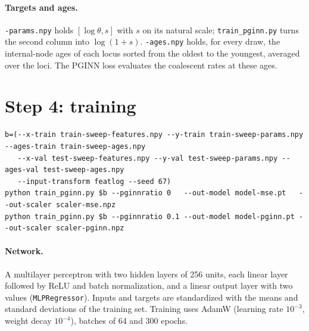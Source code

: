 \documentclass[11pt]{article}
\newcommand{\file}[1]{\texttt{#1}}
\newcommand{\pginn}{PGINN\xspace}
\begin{document}
\paragraph{Targets and ages.}
\file{-params.npy} holds $[\log\theta, s]$ with $s$ on its natural
scale; \file{train\_pginn.py} turns the second column into
$\log(1{+}s)$.
\file{-ages.npy} holds, for every draw, the internal-node ages of each
locus sorted from the oldest to the youngest, averaged over the loci.
The \pginn loss evaluates the coalescent rates at these ages.

\section{Step 4: training}\label{sec:step4}

\begin{lstlisting}
b=(--x-train train-sweep-features.npy --y-train train-sweep-params.npy --ages-train train-sweep-ages.npy
   --x-val test-sweep-features.npy --y-val test-sweep-params.npy --ages-val test-sweep-ages.npy
   --input-transform featlog --seed 67)
python train_pginn.py $b --pginnratio 0   --out-model model-mse.pt   --out-scaler scaler-mse.npz
python train_pginn.py $b --pginnratio 0.1 --out-model model-pginn.pt --out-scaler scaler-pginn.npz
\end{lstlisting}

\paragraph{Network.}
A multilayer perceptron with two hidden layers of 256 units, each linear
layer followed by ReLU and batch normalization, and a linear output
layer with two values (\texttt{MLPRegressor}).
Inputs and targets are standardized with the means and standard
deviations of the training set.
Training uses AdamW (learning rate $10^{-3}$, weight decay $10^{-4}$),
batches of 64 and 300 epochs.
\end{document}
